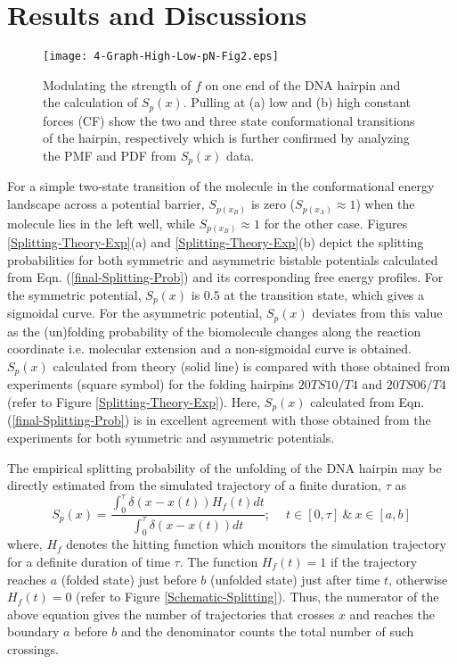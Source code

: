 \documentclass[twoside,twocolumn,9pt]{article}
\begin{document}
\section{Results and Discussions} \label{results-discussions}

\begin{figure*}[t!]
\texttt{[image: 4-Graph-High-Low-pN-Fig2.eps]}
\caption{Modulating the strength of $f$ on one end of the DNA hairpin and the calculation of $S_{p}(x)$.
Pulling at (a) low and (b) high constant forces (CF) show the two and three state conformational transitions of the hairpin, 
respectively which is further confirmed by analyzing the PMF and PDF from $S_{p}(x)$ data.} 
\label{Splitting-DNA-Low-High-pN}
\end{figure*}

For a simple two-state transition of the molecule in the conformational energy landscape across a 
potential barrier, $S_{p(x_{B})}$ is zero ($S_{p(x_{A})} \approx 1$) when the molecule lies in the 
left well, while $S_{p(x_{B})} \approx 1$ for the other case. 
Figures \ref{Splitting-Theory-Exp}(a) and \ref{Splitting-Theory-Exp}(b) depict the splitting probabilities
for both symmetric and asymmetric bistable potentials calculated from Eqn. (\ref{final-Splitting-Prob}) and its 
corresponding free energy profiles.
For the symmetric potential, $S_{p}(x)$ is 
$0.5$ at the transition state, which gives a sigmoidal curve. For the asymmetric potential, $S_{p}(x)$ deviates 
from this value as the (un)folding probability of the biomolecule changes along the reaction 
coordinate i.e. molecular extension and a non-sigmoidal curve is obtained. $S_{p}(x)$ calculated from theory 
(solid line) is compared with those obtained from experiments \cite{manuel2015reconstructing} (square symbol) 
for the folding hairpins $20TS10/T4$ and $20TS06/T4$ (refer to Figure \ref{Splitting-Theory-Exp}). 
Here, $S_{p}(x)$ calculated from Eqn. (\ref{final-Splitting-Prob}) is in excellent agreement with those obtained 
from the experiments for both symmetric and asymmetric potentials. 

The empirical splitting probability of the unfolding of the DNA hairpin may be directly estimated from the 
simulated trajectory of a finite duration, $\tau$ as\cite{covino2019molecular,manuel2015reconstructing,chodera2011splitting}
\begin{equation}
S_{p}(x)=\frac{\int_{0}^{\tau}\delta(x-x(t))H_{f}(t)dt}{\int_{0}^{\tau}\delta(x-x(t))dt}; \quad\ t\in[0,\tau]\ \&\ x\in[a,b]
\label{Empirical-SP}
\end{equation}
where, $H_{f}$ denotes the hitting function which monitors the simulation trajectory for a definite duration of time 
$\tau$. The function $H_{f}(t)=1$ if the trajectory reaches $a$
(folded state) just before $b$ (unfolded state) just after time $t$, otherwise $H_{f}(t)=0$
(refer to Figure \ref{Schematic-Splitting}). Thus, the numerator of the above equation gives the number of 
trajectories that crosses $x$ and reaches the boundary $a$ before $b$ and the denominator counts the total 
number of such crossings. 
\end{document}
